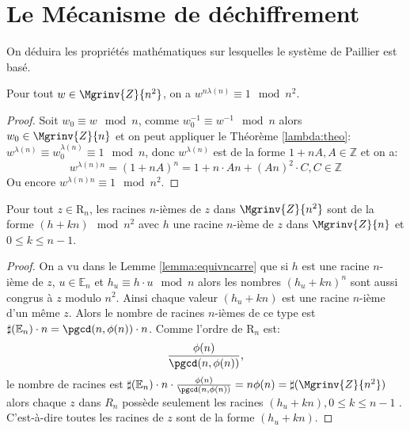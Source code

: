 	\section{Le Mécanisme de déchiffrement}	
	\label{sec:mecanisme}
	On déduira les propriétés ma\-thé\-ma\-ti\-ques sur lesquelles le système 
	de Paillier est basé.


	\begin{lemma} Pour tout $w \in \Mgrinv{Z}{n^2}$, on a $w^{n\lambda(n)}\equiv 1 \mod{n^2}$.

		\label{lemma:nlambda}
		\begin{proof}
			Soit $w_0 \equiv w \mod{n}$, comme $w_0^{-1} \equiv w^{-1}\mod{n}$ alors $w_0\in \Mgrinv{Z}{n}$ et on peut appliquer le Théorème \ref{lambda:theo}:
			$w^{\lambda(n)} \equiv w_0^{\lambda(n)} \equiv  1\mod{n}$, donc $w^{\lambda(n)}$ est de la forme
			$1+nA, A\in \mathbb{Z}$ et on a:
			$$w^{\lambda(n)n} = (1+nA)^n = 1+n\cdot An+(An)^2\cdot C, C \in \mathbb{Z}$$
			Ou encore $w^{\lambda(n)n} \equiv 1\mod{n^2}$.
		\end{proof}
	\end{lemma}
	\begin{lemma} Pour tout $z \in \mathrm{R}_n$, les racines $n$-ièmes de $z$ dans $\Mgrinv{Z}{n^2}$ sont de la 
		forme $(h+kn)\mod{n^2}$ avec $h$ une racine $n$-ième de $z$ dans $\Mgrinv{Z}{n}$ 
		et $0\leq k\leq n-1$.\label{lemma:racines}
		\begin{proof}
			On a vu dans le Lemme \ref{lemma:equivncarre} que si $h$ est une racine $n$-ième de $z$, $u\in\mathbb{E}_n$ 
			et $h_u \equiv h\cdot u\mod{n}$ alors les nombres $(h_u+kn)^n$ sont aussi congrus à 
			$z$ modulo $n^2$. Ainsi chaque valeur $(h_u+kn)$ est une racine $n$-ième d'un même $z$.
			Alors le nombre de racines $n$-ièmes de ce type est $\sharp(\mathbb{E}_n)\cdot n = \pgcd(n,\phi(n))\cdot n$. Comme l'ordre 
			de $\mathrm{R}_n$ est: $$\frac{\phi(n)}{\pgcd(n,\phi(n))}\text{,}$$ le nombre de racines est 
			$\sharp(\mathbb{E}_n)\cdot n \cdot \frac{\phi(n)}{\pgcd(n,\phi(n))} = n\phi(n) = \sharp(\Mgrinv{Z}{n^2})$ alors
			chaque $z$ dans $R_n$ possède seulement les racines $(h_u+kn), 0 \leq k \leq n-1$ . C'est-à-dire toutes les racines de $z$ sont 
			de la forme $(h_u+kn)$.
		\end{proof}
	\end{lemma}

